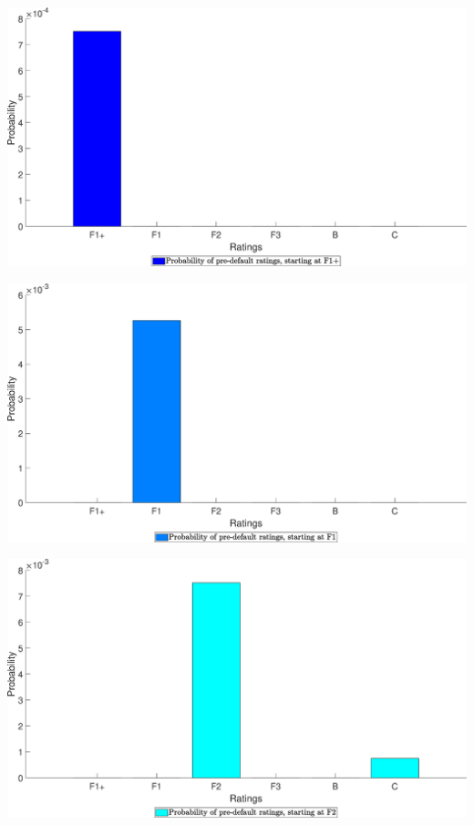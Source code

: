 \begin{landscape}
\includegraphics[width=.95\columnwidth]{PrePDP/PrePDP_FOBB_1}
\end{landscape}
\begin{landscape}
\includegraphics[width=.95\columnwidth]{PrePDP/PrePDP_FOBB_2}
\end{landscape}
\begin{landscape}
\includegraphics[width=.95\columnwidth]{PrePDP/PrePDP_FOBB_3}
\end{landscape}
